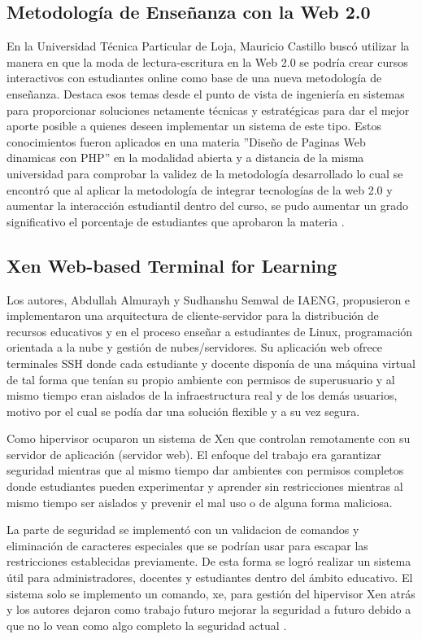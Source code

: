 \subsection{Metodología de Enseñanza con la Web 2.0}
En la Universidad Técnica Particular de Loja, Mauricio Castillo buscó utilizar la manera en que la moda de lectura-escritura en la Web 2.0 se podría crear cursos interactivos con estudiantes online como base de una nueva metodología de enseñanza. Destaca esos temas desde el punto de vista de ingeniería en sistemas para proporcionar soluciones netamente técnicas y estratégicas para dar el mejor aporte posible a quienes deseen implementar un sistema de este tipo. Estos conocimientos fueron aplicados en una materia ''Diseño de Paginas Web dinamicas con PHP'' en la modalidad abierta y a distancia de la misma universidad para comprobar la validez de la metodología desarrollado lo cual se encontró que al aplicar la metodología de integrar tecnologías de la web 2.0 y aumentar la interacción estudiantil dentro del curso, se pudo aumentar un grado significativo el porcentaje de estudiantes que aprobaron la materia \citep{UTPL-Thesis-Edu-Web-2}.

\subsection{Xen Web-based Terminal for Learning}
Los autores, Abdullah Almurayh y Sudhanshu Semwal de IAENG, propusieron e implementaron una arquitectura de cliente-servidor para la distribución de recursos educativos y en el proceso enseñar a estudiantes de Linux, programación orientada a la nube y gestión de nubes/servidores. Su aplicación web ofrece terminales SSH donde cada estudiante y docente disponía de una máquina virtual de tal forma que tenían su propio ambiente con permisos de superusuario y al mismo tiempo eran aislados de la infraestructura real y de los demás usuarios, motivo por el cual se podía dar una solución flexible y a su vez segura.

Como hipervisor ocuparon un sistema de Xen que controlan remotamente con su servidor de aplicación (servidor web). El enfoque del trabajo era garantizar seguridad mientras que al mismo tiempo dar ambientes con permisos completos donde estudiantes pueden experimentar y aprender sin restricciones mientras al mismo tiempo ser aislados y prevenir el mal uso o de alguna forma maliciosa.

La parte de seguridad se implementó con un validacion de comandos y eliminación de caracteres especiales que se podrían usar para escapar las restricciones establecidas previamente. De esta forma se logró realizar un sistema útil para administradores, docentes y estudiantes dentro del ámbito educativo. El sistema solo se implemento un comando, xe, para gestión del hipervisor Xen atrás y los autores dejaron como trabajo futuro mejorar la seguridad a futuro debido a que no lo vean como algo completo la seguridad actual \citep{almurayh2014xen}.


